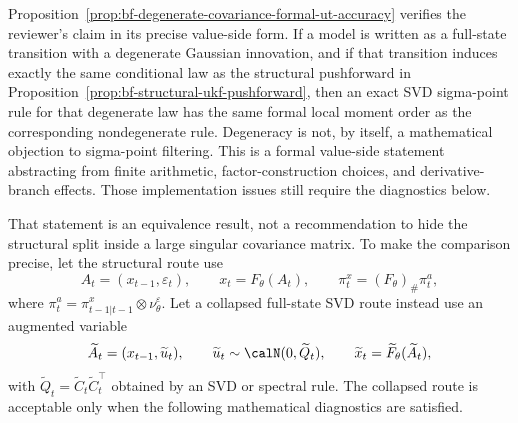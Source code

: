 Proposition~\ref{prop:bf-degenerate-covariance-formal-ut-accuracy} verifies
the reviewer's claim in its precise value-side form.  If a model is written as
a full-state transition with a degenerate Gaussian innovation, and if that
transition induces exactly the same conditional law as the structural
pushforward in Proposition~\ref{prop:bf-structural-ukf-pushforward}, then an
exact SVD sigma-point rule for that degenerate law has the same formal local
moment order as the corresponding nondegenerate rule.  Degeneracy is not, by
itself, a mathematical objection to sigma-point filtering.
This is a formal value-side statement abstracting from finite arithmetic,
factor-construction choices, and derivative-branch effects.  Those
implementation issues still require the diagnostics below.

That statement is an equivalence result, not a recommendation to hide the
structural split inside a large singular covariance matrix.  To make the
comparison precise, let the structural route use
\[
  A_t=(x_{t-1},\varepsilon_t),\qquad
  x_t=F_\theta(A_t),\qquad
  \pi_t^x=(F_\theta)_\#\pi_t^a ,
\]
where $\pi_t^a=\pi_{t-1|t-1}^x\otimes\nu_\theta^\varepsilon$.  Let a collapsed
full-state SVD route instead use an augmented variable
\[
  \widetilde A_t=(x_{t-1},\widetilde u_t),\qquad
  \widetilde u_t\sim\calN(0,\widetilde Q_t),\qquad
  \widetilde x_t=\widetilde F_\theta(\widetilde A_t),
\]
with $\widetilde Q_t=\widetilde C_t\widetilde C_t^\top$ obtained by an SVD or
spectral rule.  The collapsed route is acceptable only when the following
mathematical diagnostics are satisfied.

